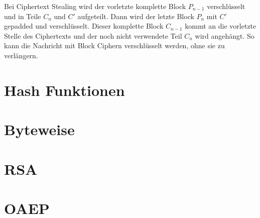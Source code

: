 Bei Ciphertext Stealing wird der vorletzte komplette Block $P_{n-1}$ verschlüsselt und in Teile $C_n$ und $C'$ aufgeteilt. 
Dann wird der letzte Block $P_n$ mit $C'$ gepadded und verschlüsselt. Dieser komplette Block $C_{n-1}$ kommt an die vorletzte Stelle des Ciphertexts und der noch nicht 
verwendete Teil $C_n$ wird angehängt. So kann die Nachricht mit Block Ciphern verschlüsselt werden, ohne sie zu verlängern.

\section{Hash Funktionen}
\section{Byteweise}
\section{RSA}
\section{OAEP}





